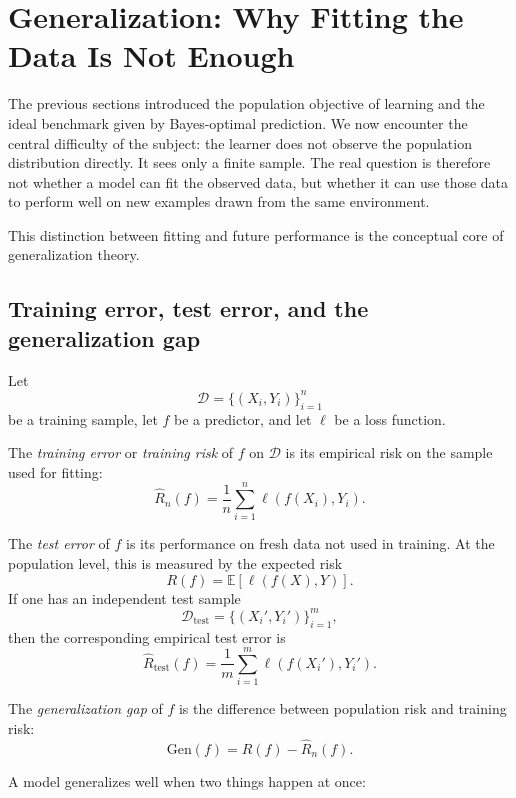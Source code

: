 \section{Generalization: Why Fitting the Data Is Not Enough}

The previous sections introduced the population objective of learning and the ideal benchmark given by Bayes-optimal prediction. We now encounter the central difficulty of the subject: the learner does not observe the population distribution directly. It sees only a finite sample. The real question is therefore not whether a model can fit the observed data, but whether it can use those data to perform well on new examples drawn from the same environment.

This distinction between fitting and future performance is the conceptual core of generalization theory.

\subsection*{Training error, test error, and the generalization gap}

Let
\[
\mathcal D=\{(X_i,Y_i)\}_{i=1}^n
\]
be a training sample, let $f$ be a predictor, and let $\ell$ be a loss function.

\begin{definition}
The \emph{training error} or \emph{training risk} of $f$ on $\mathcal D$ is its empirical risk on the sample used for fitting:
\[
\widehat R_n(f)=\frac1n\sum_{i=1}^n \ell(f(X_i),Y_i).
\]
\end{definition}

\begin{definition}
The \emph{test error} of $f$ is its performance on fresh data not used in training. At the population level, this is measured by the expected risk
\[
R(f)=\mathbb E[\ell(f(X),Y)].
\]
If one has an independent test sample
\[
\mathcal D_{\mathrm{test}}=\{(X_i',Y_i')\}_{i=1}^m,
\]
then the corresponding empirical test error is
\[
\widehat R_{\mathrm{test}}(f)=\frac1m\sum_{i=1}^m \ell(f(X_i'),Y_i').
\]
\end{definition}

\begin{definition}
The \emph{generalization gap} of $f$ is the difference between population risk and training risk:
\[
\mathrm{Gen}(f)=R(f)-\widehat R_n(f).
\]
\end{definition}

A model generalizes well when two things happen at once:

